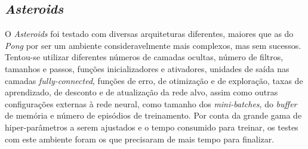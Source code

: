 

\subsection{\textit{Asteroids}}
\label{sec:arq_asteroids}

O \textit{Asteroids} foi testado com diversas arquiteturas diferentes, maiores que as do \textit{Pong} por ser um ambiente consideravelmente mais complexos, mas sem sucessos.
Tentou-se utilizar diferentes números de camadas ocultas, número de filtros, tamanhos e passos, funções inicializadores e ativadores, unidades de saída nas camadas \textit{fully-connected}, funções de erro, de otimização e de exploração, taxas de aprendizado, de desconto e de atualização da rede alvo, assim como outras configurações externas à rede neural, como tamanho dos \textit{mini-batches}, do \textit{buffer} de memória e número de episódios de treinamento.
Por conta da grande gama de hiper-parâmetros a serem ajustados e o tempo consumido para treinar, os testes com este ambiente foram os que precisaram de mais tempo para finalizar.

